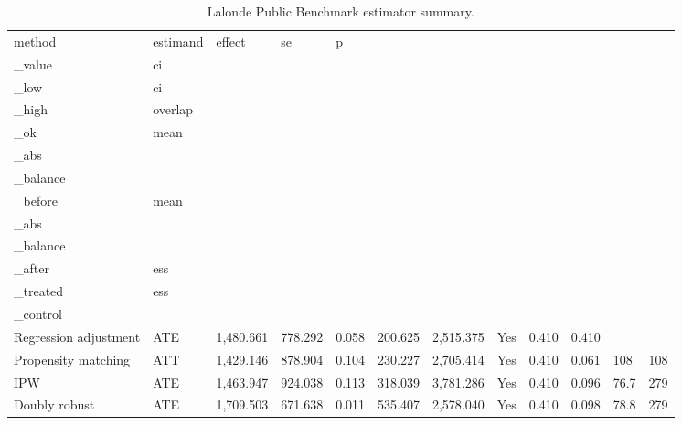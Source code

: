 \begin{table}[t!]
\centering
\small
\caption{Lalonde Public Benchmark estimator summary.}
\label{tab:lalonde_public_benchmark-estimators}
\setlength{\tabcolsep}{4.5pt}
\begin{tabular}{llllllllllll}
\hline
method & estimand & effect & se & p\\_value & ci\\_low & ci\\_high & overlap\\_ok & mean\\_abs\\_balance\\_before & mean\\_abs\\_balance\\_after & ess\\_treated & ess\\_control \\
\hline
Regression adjustment & ATE & 1,480.661 & 778.292 & 0.058 & 200.625 & 2,515.375 & Yes & 0.410 & 0.410 &  &  \\
Propensity matching & ATT & 1,429.146 & 878.904 & 0.104 & 230.227 & 2,705.414 & Yes & 0.410 & 0.061 & 108 & 108 \\
IPW & ATE & 1,463.947 & 924.038 & 0.113 & 318.039 & 3,781.286 & Yes & 0.410 & 0.096 & 76.7 & 279 \\
Doubly robust & ATE & 1,709.503 & 671.638 & 0.011 & 535.407 & 2,578.040 & Yes & 0.410 & 0.098 & 78.8 & 279 \\
\hline
\end{tabular}
\end{table}
